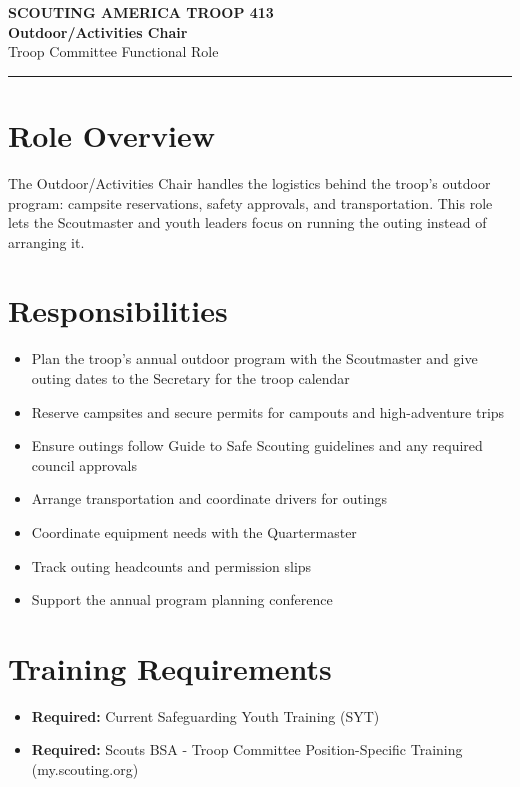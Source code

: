 \documentclass[11pt, letterpaper]{article}
\begin{document}
\begin{center}
  {\small\color{scoutgreen}\textbf{SCOUTING AMERICA \textbullet{} TROOP 413}} \\[4pt]
  {\fontsize{20pt}{24pt}\selectfont\bfseries\color{scoutgreen} Outdoor/Activities Chair} \\[4pt]
  {\large\color{accent} Troop Committee \textbullet{} Functional Role} \\[4pt]
  \textcolor{accent}{\rule{0.6\linewidth}{1pt}}
\end{center}

\vspace{0.3em}

\begin{minipage}[t]{0.48\linewidth}
\raggedright

\section{Role Overview}
The Outdoor/Activities Chair handles the logistics behind the troop's outdoor program: campsite reservations, safety approvals, and transportation. This role lets the Scoutmaster and youth leaders focus on running the outing instead of arranging it.

\vspace{0.4em}
\section{Responsibilities}
\begin{itemize}
  \item Plan the troop's annual outdoor program with the Scoutmaster and give outing dates to the Secretary for the troop calendar
  \item Reserve campsites and secure permits for campouts and high-adventure trips
  \item Ensure outings follow Guide to Safe Scouting guidelines and any required council approvals
  \item Arrange transportation and coordinate drivers for outings
  \item Coordinate equipment needs with the Quartermaster
  \item Track outing headcounts and permission slips
  \item Support the annual program planning conference
\end{itemize}

\section{Training Requirements}
\begin{itemize}
  \item \textbf{Required:} Current Safeguarding Youth Training (SYT)
  \item \textbf{Required:} Scouts BSA - Troop Committee Position-Specific Training (my.scouting.org)
\end{itemize}

\end{minipage}
\end{document}
